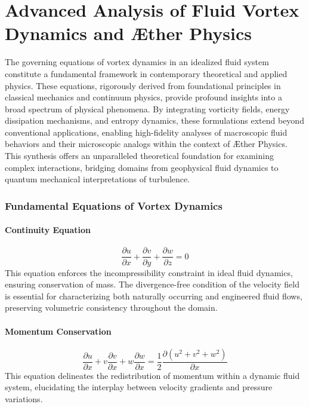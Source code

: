 

    \chapter{Advanced Analysis of Fluid Vortex Dynamics and Æther Physics}

    The governing equations of vortex dynamics in an idealized fluid system constitute a fundamental framework in contemporary theoretical and applied physics. These equations, rigorously derived from foundational principles in classical mechanics and continuum physics, provide profound insights into a broad spectrum of physical phenomena. By integrating vorticity fields, energy dissipation mechanisms, and entropy dynamics, these formulations extend beyond conventional applications, enabling high-fidelity analyses of macroscopic fluid behaviors and their microscopic analogs within the context of Æther Physics. This synthesis offers an unparalleled theoretical foundation for examining complex interactions, bridging domains from geophysical fluid dynamics to quantum mechanical interpretations of turbulence.

    \subsection*{Fundamental Equations of Vortex Dynamics}

    \subsubsection*{Continuity Equation}
    \begin{equation*}
        \frac{\partial u}{\partial x} + \frac{\partial v}{\partial y} + \frac{\partial w}{\partial z} = 0
    \end{equation*}
    This equation enforces the incompressibility constraint in ideal fluid dynamics, ensuring conservation of mass. The divergence-free condition of the velocity field is essential for characterizing both naturally occurring and engineered fluid flows, preserving volumetric consistency throughout the domain.

    \subsubsection*{Momentum Conservation}
    \begin{equation*}
        \frac{\partial u}{\partial x} + v \frac{\partial v}{\partial x} + w \frac{\partial w}{\partial x} = \frac{1}{2} \frac{\partial (u^2 + v^2 + w^2)}{\partial x}
    \end{equation*}
    This equation delineates the redistribution of momentum within a dynamic fluid system, elucidating the interplay between velocity gradients and pressure variations.


